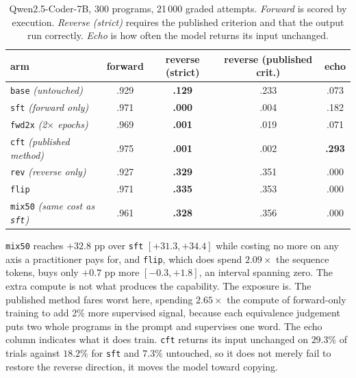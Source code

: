 \documentclass{article}
\newcommand{\arm}[1]{\texttt{#1}}
\begin{document}
\begin{table}[t]
\centering\small
\caption{Qwen2.5-Coder-7B, 300 programs, 21\,000 graded attempts. \emph{Forward} is scored
by execution. \emph{Reverse (strict)} requires the published criterion and that the output
run correctly. \emph{Echo} is how often the model returns its input unchanged.}
\label{tab:main7b}
\begin{tabular}{lcccc}
\toprule
arm & forward & \textbf{reverse (strict)} & reverse (published crit.) & echo \\
\midrule
\arm{base} \emph{(untouched)}      & .929 & \textbf{.129} & .233 & .073 \\
\arm{sft} \emph{(forward only)}    & .971 & \textbf{.000} & .004 & .182 \\
\arm{fwd2x} \emph{(2$\times$ epochs)} & .969 & \textbf{.001} & .019 & .071 \\
\arm{cft} \emph{(published method)} & .975 & \textbf{.001} & .002 & \textbf{.293} \\
\arm{rev} \emph{(reverse only)}    & .927 & \textbf{.329} & .351 & .000 \\
\arm{flip}                         & .971 & \textbf{.335} & .353 & .000 \\
\arm{mix50} \emph{(same cost as \arm{sft})} & .961 & \textbf{.328} & .356 & .000 \\
\bottomrule
\end{tabular}
\end{table}

\arm{mix50} reaches $+32.8$ pp over \arm{sft} $[+31.3,+34.4]$ while costing no more on any axis
a practitioner pays for, and \arm{flip}, which does spend $2.09\times$ the sequence tokens,
buys only $+0.7$ pp more $[-0.3,+1.8]$, an interval spanning zero. The extra compute is not
what produces the capability. The exposure is. The published method fares worst here, spending
$2.65\times$ the compute of forward-only training to add 2\% more supervised signal, because
each equivalence judgement puts two whole programs in the prompt and supervises one word.
The echo column indicates what it does train. \arm{cft} returns its input unchanged on $29.3\%$
of trials against $18.2\%$ for \arm{sft} and $7.3\%$ untouched, so it does not merely fail to
restore the reverse direction, it moves the model toward copying.
\end{document}
